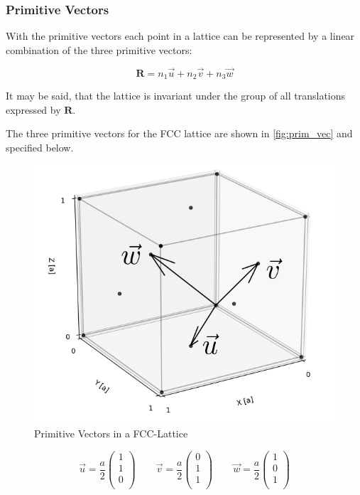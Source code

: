 \subsubsection*{Primitive Vectors}
With the primitive vectors each point in a lattice can be represented
by a linear combination of the three primitive vectors:

$$\mathbf{R} = n_1 \vec{u} + n_2 \vec{v} + n_3 \vec{w}$$

It may be said, that the lattice is invariant under the group of all 
translations expressed by $\mathbf{R}$.

The three primitive vectors for the FCC lattice are shown in 
\autoref{fig:prim_vec} and specified below.

\begin{figure}[H]
	\centering
	\includegraphics[width=0.5\linewidth]{Graphics/Chapter1/prim_vec}
	\caption{Primitive Vectors in a FCC-Lattice}
	\label{fig:prim_vec}
\end{figure}

\begin{equation}
	\vec{u} = \frac{a}{2} \left(\begin{matrix}1\\1\\0\\\end{matrix}\right) \qquad
	\vec{v} = \frac{a}{2} \left(\begin{matrix}0\\1\\1\\\end{matrix}\right) \qquad
	\vec{w} = \frac{a}{2} \left(\begin{matrix}1\\0\\1\\\end{matrix}\right)
	\label{eq:prim_vec}
\end{equation}


